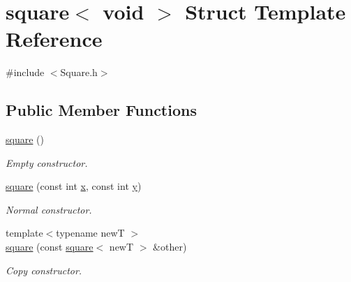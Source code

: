 \hypertarget{structsquare_3_01void_01_4}{}\section{square$<$ void $>$ Struct Template Reference}
\label{structsquare_3_01void_01_4}


{\ttfamily \#include $<$Square.\+h$>$}

\subsection*{Public Member Functions}
\begin{DoxyCompactItemize}
\item 
\mbox{\label{structsquare_3_01void_01_4_a9ba4bc7062257af4dc7bc68d91afc8dd}} 
\hyperlink{structsquare_3_01void_01_4_a9ba4bc7062257af4dc7bc68d91afc8dd}{square} ()
\begin{DoxyCompactList}\small\item\em Empty constructor. \end{DoxyCompactList}\item 
\mbox{\label{structsquare_3_01void_01_4_acad0604c4c01934956f9e547b61963bd}} 
\hyperlink{structsquare_3_01void_01_4_acad0604c4c01934956f9e547b61963bd}{square} (const int \hyperlink{structsquare_3_01void_01_4_a1b2185b1eacd68916a02287c21916a25}{x}, const int \hyperlink{structsquare_3_01void_01_4_a2f5565ddd32970d151f1973db2fc3881}{y})
\begin{DoxyCompactList}\small\item\em Normal constructor. \end{DoxyCompactList}\item 
\mbox{\label{structsquare_3_01void_01_4_a3144b85567ed10bfc6ecc5cafbe4e4ac}} 
{\footnotesize template$<$typename newT $>$ }\\\hyperlink{structsquare_3_01void_01_4_a3144b85567ed10bfc6ecc5cafbe4e4ac}{square} (const \hyperlink{structsquare}{square}$<$ newT $>$ \&other)
\begin{DoxyCompactList}\small\item\em Copy constructor. \end{DoxyCompactList}\item 
\mbox{\label{structsquare_3_01void_01_4_ab7ae9a220b3d4aa3afce1873c25558eb}} 

\end{DoxyCompactItemize}

